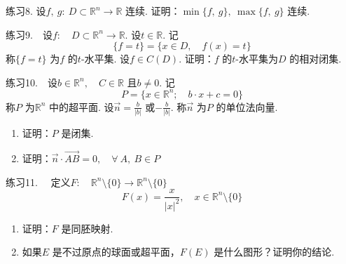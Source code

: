 \documentclass{article}
\begin{document}
练习8. 设\(f,\ g:\ D \subset \mathbb{R}^n \to \mathbb{R}\) 连续. 证明：\(\min \{f,\ g\},\ \max \{f,\ g\}  \) 连续.

\vspace{10pt}

练习9.\ \ 设\(f:\quad D \subset \mathbb{R}^n \to \mathbb{R}\). 设\(t \in \mathbb{R}\). 记
\begin{equation*}
    \{ f = t\} = \{x \in D,\quad f(x) = t\}
\end{equation*}
称\(\{f = t\} \) 为\(f\) 的\(t\)-水平集. 设\(f \in C(D)\). 证明：\(f\) 的\(t\)-水平集为\(D\) 的相对闭集.

\newpage

练习10.\ \ 设\(b \in \mathbb{R}^n,\quad C \in \mathbb{R}\) 且\(b \neq 0\). 记
\begin{equation*}
    P = \{x \in \mathbb{R}^n;\quad b \cdot x + c = 0\}
\end{equation*}
称\(P\) 为\(\mathbb{R}^n\) 中的超平面. 设\(\vec{n} = \frac{b}{| b | } \) 或\( - \frac{b}{| b | } \). 称\(\vec{n}\) 为\(P\) 的单位法向量.
\begin{enumerate}
    \item 证明：\(P\) 是闭集.
    \item 证明：\(\vec{n} \cdot \vec{AB} = 0,\quad \forall\ A,\ B \in P\)
\end{enumerate}

\vspace{10pt}

练习11. \ \ 定义\(F:\quad \mathbb{R}^n\setminus \{0\}\to \mathbb{R}^n\setminus \{0\}  \)
\begin{equation*}
    F(x) = \frac{x}{| x |^2  },\quad x \in \mathbb{R}^n\setminus \{0\}
\end{equation*}
\begin{enumerate}
    \item 证明：\(F\) 是同胚映射.
    \item 如果\(E\) 是不过原点的球面或超平面，\(F(E)\) 是什么图形？证明你的结论.
\end{enumerate}
\end{document}
